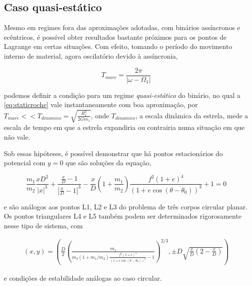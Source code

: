 \subsection{Caso quasi-estático}

Mesmo em regimes fora das aproximações adotadas, com binários assíncronos e ecêntricos, é possível obter resultados bastante próximos para os pontos de Lagrange em certas situações. Com efeito, tomando o período do movimento interno de material, agora oscilatório devido à assíncronia,

\begin{equation}
    T_{mare} = \frac{2\pi}{|\omega - \Omega_1|}
\end{equation}

podemos definir a condição para um regime \textit{quasi-estático} do binário, no qual a \ref{eq:staticroche} vale instantaneamente com boa aproximação, por $T_{mare} << T_{dinamico} = \sqrt{\frac{R_1^3}{2Gm_1}}$, onde $T_{dinamico} $, a escala dinâmica da estrela, mede a escala de tempo em que a estrela expandiria ou contrairia numa situação em que \label{eq:staticroche} não vale.

Sob essas hipóteses, é possível demonstrar \cite{nonsyncbin} que há pontos estacionários do potencial com $y = 0$ que são soluções da equação,

\begin{equation}
    \frac{m_1}{m_2}\frac{xD^2}{|x|^3}+\frac{\frac{x}{D}-1}{|\frac{x}{D}-1|^3}-\frac{x}{D}\left(1+\frac{m_1}{m_2}\right)\frac{f^2(1+e)^4}{(1+e\cos(\theta - \theta_0))^3}+1=0
\end{equation}

e são análogos aos pontos L1, L2 e L3 do problema de três corpos circular planar. Os pontos triangulares L4 e L5 também podem ser determinados rigorosamente nesse tipo de sistema, com

\begin{align}
    (x, y) = \left(\frac{D}{2}\left(\frac{m_1}{m_2(1 + m_1/m_2)\frac{f^2(1+e)^4}{(1+e\cos(\theta - \theta_0))^3} - 1}\right)^{2/3},\pm D\sqrt{\frac{x}{D}\left(2 - \frac{x}{D}\right)}\right)
\end{align}

e condições de estabilidade análogas ao caso circular.